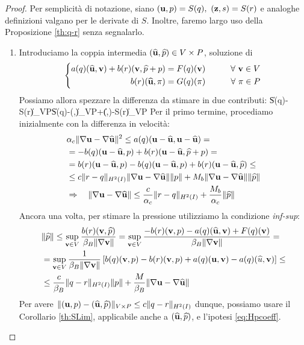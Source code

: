 \begin{proof}
	Per semplicità di notazione, siano $(\mathbf{u},p)=S(q),\ (\mathbf{z},s)=S(r)$ e analoghe definizioni valgano per le derivate di $S$. Inoltre, faremo largo uso della Proposizione \ref{th:q-r} senza segnalarlo.
	\begin{enumerate}
     \item
	Introduciamo la coppia intermedia $(\widehat{\mathbf{u}},\widehat{p})\in V\times P$, soluzione di
	\begin{equation*}
	\left\{
	\begin{aligned}
		a(q)(\widehat{\mathbf{u}},\mathbf{v}) + b(r)(\mathbf{v},\widehat{p}+p) &= F(q)(\mathbf{v})\qquad&\forall\ \mathbf{v}\in  V\\
		b(r)(\widehat{\mathbf{u}},\pi) &= G(q)(\pi) \qquad&\forall\ \pi \in P\\
	\end{aligned}\right.\\
	\end{equation*}
	Possiamo allora spezzare la differenza da stimare in due contributi:
	\beq
		\|S(q)-S(r)\|_{V\times P}\leq\|S(q)-(\widehat{\u},)\|_{V\times P}+\|(\widehat{\u},)-S(r)\|_{V\times P}
	\label{eq:Sq-Sr}
	\eeq
	Per il primo termine, procediamo inizialmente con la differenza in velocità:
	\begin{equation*}\begin{split}
	&\alpha_c\|\nabla\mathbf{u}-\nabla\widehat{\mathbf{u}}\|^2\leq a(q)(\mathbf{u}-\widehat{\mathbf{u}},\mathbf{u}-\widehat{\mathbf{u}})=\\
	&=-b(q)(\mathbf{u}-\widehat{\mathbf{u}},p)+b(r)(\mathbf{u}-\widehat{\mathbf{u}},\widehat{p}+p)=\\
	&= b(r)(\mathbf{u}-\widehat{\mathbf{u}},p)-b(q)(\mathbf{u}-\widehat{\mathbf{u}},p)+b(r)(\mathbf{u}-\widehat{\mathbf{u}},\widehat{p})\leq\\
	&\leq c\|r-q\|_{H^2(I)}\|\nabla\mathbf{u}-\nabla\widehat{\mathbf{u}}\|\|p\|+M_b\|\nabla\mathbf{u}-\nabla\widehat{\mathbf{u}}\|\|\widehat{p}\|\\
	&\Rightarrow\quad \|\nabla\mathbf{u}-\nabla\widehat{\mathbf{u}}\|\leq \frac{c}{\alpha_c}\|r-q\|_{H^2(I)}+\frac{M_b}{\alpha_c}\|\widehat{p}\|
	\end{split}\end{equation*}
	Ancora una volta, per stimare la pressione utilizziamo la condizione \emph{inf-sup}:
	\begin{equation*}\begin{split}
	&\|\widehat{p}\|\leq \sup_{\mathbf{v}\in V}\frac{b(r)(\mathbf{v},\widehat{p})}{\beta_B\|\nabla\mathbf{v}\|} = \sup_{\mathbf{v}\in V}\frac{-b(r)(\mathbf{v},p)-a(q)(\widehat{\mathbf{u}},\mathbf{v})+F(q)(\mathbf{v})}{\beta_B\|\nabla\mathbf{v}\|}=\\
	&=\sup_{\mathbf{v}\in V}\frac{1}{\beta_B\|\nabla\mathbf{v}\|}\left[b(q)(\mathbf{v},p)-b(r)(\mathbf{v},p)+a(q)(\mathbf{u},\mathbf{v})-a(q)(\widehat{u},\mathbf{v})\right]\leq\\
	&\leq \frac{c}{\beta_B}\|q-r\|_{H^2(I)}\|p\|+\frac{M}{\beta_B}\|\nabla\mathbf{u}-\nabla\widehat{\mathbf{u}}\|
	\end{split}\end{equation*}
	Per avere $\|(\mathbf{u},p)-(\widehat{\mathbf{u}},\widehat{p})\|_{V\times P}\leq c\|q-r\|_{H^2(I)}$ dunque, possiamo usare il Corollario \ref{th:SLim}, applicabile anche a $(\widehat{\mathbf{u}},\widehat{p})$, e l'ipotesi \eqref{eq:Hpcoeff}.\\


\end{enumerate}
\end{proof}
